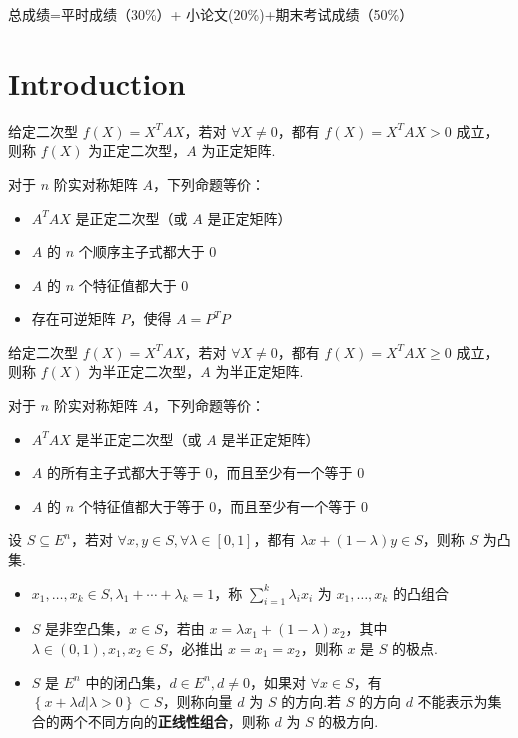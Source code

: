 

\newcommand\Title{最优化方法笔记}
\renewcommand\due{due: 16 weeks}
\newcommand\subject{\operatorname{subject\ to}}



总成绩=平时成绩（30\%）+ 小论文(20\%)+期末考试成绩（50\%）
\section{Introduction}
\begin{remark}
    给定二次型 $f(X) = X^T AX$，若对 $\forall X \neq 0$，都有 $f(X) = X^T AX > 0$ 成立，则称 $f(X)$ 为正定二次型，$A$ 为正定矩阵.

    对于 $n$ 阶实对称矩阵 $A$，下列命题等价：
    \begin{itemize}
        \item $A^T AX$ 是正定二次型（或 $A$ 是正定矩阵）
        \item $A$ 的 $n$ 个顺序主子式都大于 0
        \item $A$ 的 $n$ 个特征值都大于 0
        \item 存在可逆矩阵 $P$，使得 $A = P^T P$
    \end{itemize}
\end{remark}

\begin{remark}
    给定二次型 $f(X) = X^T AX$，若对 $\forall X \neq 0$，都有 $f(X) = X^T AX \ge 0$ 成立，则称 $f(X)$ 为半正定二次型，$A$ 为半正定矩阵.

    对于 $n$ 阶实对称矩阵 $A$，下列命题等价：
    \begin{itemize}
        \item $A^T AX$ 是半正定二次型（或 $A$ 是半正定矩阵）
        \item $A$ 的所有主子式都大于等于 0，而且至少有一个等于 0
        \item $A$ 的 $n$ 个特征值都大于等于 0，而且至少有一个等于 0
    \end{itemize}
\end{remark}

\begin{remark}
    设 $S \subseteq E^n$，若对 $\forall x, y \in S, \forall \lambda \in [0, 1]$，都有 $\lambda x + (1 - \lambda)y \in S$，则称 $S$ 为凸集.
    \begin{itemize}
        \item $x_1, \dots, x_k \in S, \lambda_1 + \cdots + \lambda_k = 1$，称 $\sum_{i = 1}^k \lambda_ix_i$ 为 $x_1, \dots, x_k$ 的凸组合
        \item $S$ 是非空凸集，$x\in S$，若由 $x = \lambda x_1 + (1 - \lambda)x_2$，其中 $\lambda \in (0, 1), x_1, x_2 \in S$，必推出 $x = x_1 = x_2$，则称 $x$ 是 $S$ 的极点.
        \item $S$ 是 $E^n$ 中的闭凸集，$d \in E^n, d \neq 0$，如果对 $\forall x \in S$，有 $\left\{x + \lambda d | \lambda > 0\right\} \subset S$，则称向量 $d$ 为 $S$ 的方向.若 $S$ 的方向 $d$ 不能表示为集合的两个不同方向的\textbf{正线性组合}，则称 $d$ 为 $S$ 的极方向.
    \end{itemize}
\end{remark}

